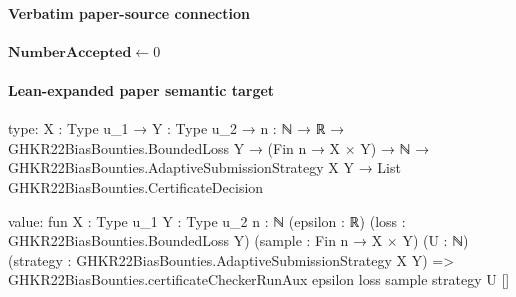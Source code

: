 \documentclass[10pt]{article}
\begin{document}
\paragraph{Verbatim paper-source connection}
\begin{ReviewVerbatim}
\begin{algorithm}
\ifdraft
\else
\small
\fi
{}
$\mathbf{NumberAccepted} \leftarrow 0$

\caption{CertificateChecker($\epsilon,D,U,(f_1,g_1,h_1),\ldots )$: An algorithm that takes as input a stream of submissions $(f_i,g_i,h_i)$ and checks if $(g_i,h_i)$ is a certificate of sub-optimality for $f_i$ with sufficiently high parameter values.}
\label{alg:checker}
\end{algorithm}
\end{ReviewVerbatim}



\paragraph{Lean-expanded paper semantic target}
\begin{ReviewVerbatim}
type:
{X : Type u_1} →
  {Y : Type u_2} →
    {n : ℕ} →
      ℝ →
        GHKR22BiasBounties.BoundedLoss Y →
          (Fin n → X × Y) →
            ℕ → GHKR22BiasBounties.AdaptiveSubmissionStrategy X Y → List GHKR22BiasBounties.CertificateDecision

value:
fun {X : Type u_1} {Y : Type u_2} {n : ℕ} (epsilon : ℝ) (loss : GHKR22BiasBounties.BoundedLoss Y)
    (sample : Fin n → X × Y) (U : ℕ) (strategy : GHKR22BiasBounties.AdaptiveSubmissionStrategy X Y) =>
  GHKR22BiasBounties.certificateCheckerRunAux epsilon loss sample strategy U []
\end{ReviewVerbatim}
\end{document}
